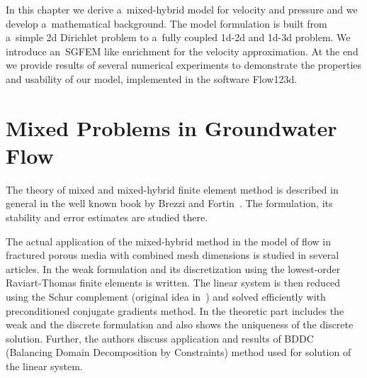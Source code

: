 
% 

In this chapter we derive a~mixed-hybrid model for velocity and pressure and we develop a~mathematical background.
The model formulation is built from a~simple 2d Dirichlet problem to a~fully coupled 1d-2d and 1d-3d problem.
We introduce an~SGFEM like enrichment for the velocity approximation.
At the end we provide results of several numerical experiments to demonstrate the properties and usability of our model,
implemented in the software Flow123d.


\section{Mixed Problems in Groundwater Flow}
The theory of mixed and mixed-hybrid finite element method is described in general in the well known book by 
Brezzi and Fortin~\cite{brezzi_mixed_1991}. 
The formulation, its stability and error estimates are studied there.

The actual application of the mixed-hybrid method in the model of flow in fractured porous 
media with combined mesh dimensions is studied in several articles.
In \cite{brezina_mixed-hybrid_2010} the weak formulation and its discretization using the lowest-order Raviart-Thomas finite 
elements is written. The linear system is then reduced using the Schur complement (original idea in~\cite{maryska_mixed-hybrid_1995})
and solved efficiently with preconditioned conjugate gradients method.
In \cite{sistek_bddc_2015} the theoretic part includes the weak and the discrete formulation and also shows
the uniqueness of the discrete solution. Further, the authors discuss application and results of BDDC 
(Balancing Domain Decomposition by Constraints) method used for solution of the linear system.

